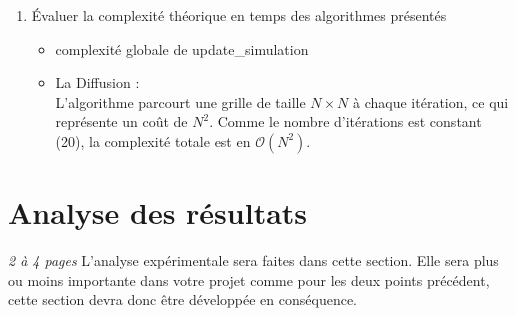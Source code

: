 \documentclass[a4paper]{article}
\begin{document}
\begin{enumerate}
\item Évaluer la complexité théorique en temps des algorithmes présentés
    \begin{itemize}
        \item complexité globale de update\_simulation
        \item {\color{WildStrawberry}La Diffusion : \\
        L’algorithme parcourt une grille de taille $N \times N$ à chaque itération, ce qui représente un coût de $N^2$. 
        Comme le nombre d’itérations est constant (20), la complexité totale est en $\mathcal{O}(N^2)$.
        }
    \end{itemize}

\end{enumerate}

\section{Analyse des résultats }
\emph{2 à 4 pages}
L'analyse expérimentale sera faites dans cette section.   Elle sera plus ou moins importante dans votre projet comme pour les deux points précédent, cette section devra donc être développée en conséquence.
\end{document}
